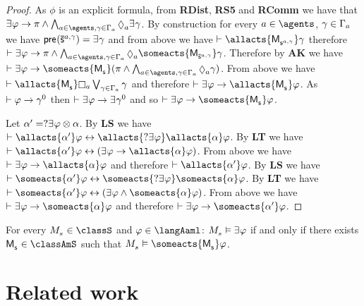 \begin{proof}
As $\phi$ is an explicit formula, from {\bf RDist}, {\bf RS5} and {\bf RComm} we have that $\somerefs \phi \implies \pi \land \bigwedge_{\agentA \in \agents, \gamma \in \Gamma_\agentA} \possible[\agentA] \somerefs \gamma$.
By construction for every $\agentA \in \agents$, $\gamma \in \Gamma_a$ we have $\aPrecondition(\aPStateS[\agentA,\gamma]) = \somerefs \gamma$ and from above we have $\proves \allacts{\aPModel{\aStateS[\agentA,\gamma]}} \gamma$ therefore $\proves \somerefs \phi \implies \pi \land \bigwedge_{\agentA \in \agents, \gamma \in \Gamma_\agentA} \possible[\agentA] \someacts{\aPModel{\aPStateS[\agentA,\gamma]}} \gamma$.
Therefore by {\bf AK} we have $\proves \somerefs \phi \implies \someacts{\aPModel{\aStateS}} (\pi \land \bigwedge_{\agentA \in \agents, \gamma \in \Gamma_\agentA} \possible[\agentA] \gamma)$.
From above we have $\proves \allacts{\aPModel{\aStateS}} \necessary[\agentA] \bigvee_{\gamma \in \Gamma_\agentA} \gamma$ and therefore $\proves \somerefs \phi \implies \allacts{\aPModel{\aStateS}} \phi$.
As $\vdash \varphi \rightarrow \gamma^0$ then $\proves \somerefs \phi \implies \somerefs \gamma^0$ and so $\proves \somerefs \phi \implies \someacts{\aPModel{\aStateS}} \phi$.

Let $\alpha' = \test{\somerefs \phi} \compose \alpha$.
By {\bf LS} we have $\proves \allacts{\alpha'} \phi \iff \allacts{\test{\somerefs \phi}} \allacts{\alpha} \phi$.
By {\bf LT} we have $\proves \allacts{\alpha'} \phi \iff (\somerefs \phi \implies \allacts{\alpha} \phi)$.
From above we have $\proves \somerefs \phi \implies \allacts{\alpha} \phi$ and therefore $\proves \allacts{\alpha'} \phi$.
By {\bf LS} we have $\proves \someacts{\alpha'} \phi \iff \someacts{\test{\somerefs \phi}} \someacts{\alpha} \phi$.
By {\bf LT} we have $\proves \someacts{\alpha'} \phi \iff (\somerefs \phi \land \someacts{\alpha} \phi)$.
From above we have $\proves \somerefs \phi \implies \someacts{\alpha} \phi$ and therefore $\proves \somerefs \phi \implies \someacts{\alpha'} \phi$.
\end{proof}

\begin{corollary}
For every $\kPModel{\kStateS} \in \classS$ and $\phi \in \langAaml$: $\kPModel{\kStateS} \entails \somerefs \phi$ if and only if there exists $\aPModel{\aStateS} \in \classAmS$ such that $\kPModel{\kStateS} \entails \someacts{\aPModel{\aStateS}} \phi$.
\end{corollary}

\section{Related work}\label{related-work}

